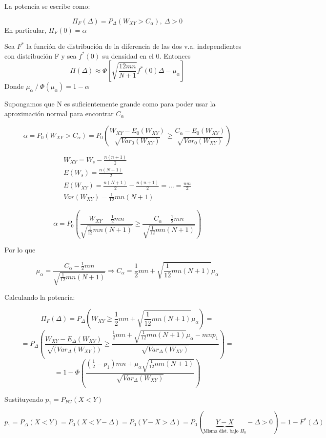 La potencia se escribe como:

$$
\Pi_F(\Delta)=P_\Delta(W_{XY}>C_\alpha),\ \Delta>0
$$
En particular, $\Pi_F(0)=\alpha$

\begin{theorem}
    Sea $F^*$ la función de distribución de la diferencia de las dos v.a. independientes con distribución F y sea $f^*(0)$ su densidad en el 0. Entonces
    $$
    \Pi(\Delta)\approx\Phi\left[\sqrt{\frac{12mn}{N+1}}f^*(0)\Delta-\mu_\alpha\right]
    $$
    Donde $\mu_\alpha\ /\ \Phi(\mu_\alpha)=1-\alpha$
\end{theorem}

Supongamos que N es suficientemente grande como para poder usar la aproximación normal para encontrar $C_\alpha$

$$
\alpha = P_0(W_{XY}>C_\alpha)=P_0\left(\frac{W_{XY}-E_0(W_{XY})}{\sqrt{Var_0(W_{XY})}}\geq \frac{C_\alpha-E_0(W_{XY})}{\sqrt{Var_0(W_{XY})}}\right)
$$

$$
\begin{array}{c}
    W_{XY}=W_s-\frac{n(n+1)}{2}\\
    E(W_s)=\frac{n(N+1)}{2}\\
    E(W_{XY})=\frac{n(N+1)}{2}-\frac{n(n+1)}{2}=\dots=\frac{nm}{2}\\
    Var(W_{XY})=\frac{1}{12}mn(N+1)
\end{array}
$$

$$
\alpha=P_0\left(\frac{W_{XY}-\frac{1}{2}mn}{\sqrt{\frac{1}{12}mn(N+1)}}\geq \frac{C_\alpha-\frac{1}{2}mn}{\sqrt{\frac{1}{12}mn(N+1)}}\right)
$$

Por lo que 

$$
\mu_\alpha=\frac{C_\alpha-\frac{1}{2}mn}{\sqrt{\frac{1}{12}mn(N+1)}} \Longrightarrow C_\alpha=\frac{1}{2}mn+\sqrt{\frac{1}{12}mn(N+1)}\mu_\alpha
$$

Calculando la potencia:

$$
\Pi_F(\Delta)=P_\Delta\left(W_{XY}\geq\frac{1}{2}mn+\sqrt{\frac{1}{12}mn(N+1)}\mu_\alpha\right)=
$$
$$
=P_\Delta\left(\frac{W_{XY}-E_\Delta(W_{XY})}{\sqrt(Var_\Delta(W_{XY}))}\geq\frac{\frac{1}{2}mn+\sqrt{\frac{1}{12}mn(N+1)}\mu_\alpha-mnp_1}{\sqrt{Var_\Delta(W_{XY})}} \right)=
$$
$$
=1-\Phi\left(\frac{\left(\frac{1}{2}-p_1\right)mn+\mu_\alpha\sqrt{\frac{1}{12}mn(N+1)}}{\sqrt{Var_\Delta(W_{XY})}}\right)
$$

Sustituyendo $p_1=P_{FG}(X<Y)$

$$
p_1=P_\Delta(X<Y)=P_0(X<Y-\Delta)=P_0(Y-X>\Delta)=P_0(\underbrace{Y-X}_\text{Misma dist. bajo $H_0$}-\Delta>0)=1-F^*(\Delta)
$$


